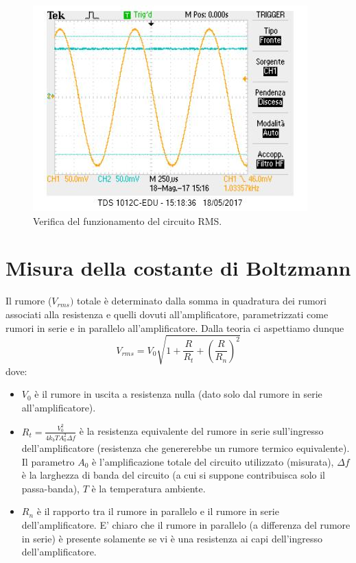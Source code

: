 \documentclass[10pt,a4paper]{article}
\begin{document}
\begin{figure}[!htb]
\centering
\includegraphics[scale=1.0]{vrms.jpg}
\caption{Verifica del funzionamento del circuito RMS.\label{rms}}
\end{figure}

\section{Misura della costante di Boltzmann}

Il rumore ($V_{rms})$ totale è determinato dalla somma in quadratura dei rumori associati alla resistenza e quelli dovuti all'amplificatore, parametrizzati come rumori in serie e in parallelo all'amplificatore. Dalla teoria ci aspettiamo dunque 
\begin{equation}
V_{rms} = V_0 \sqrt{1+\frac{R}{R_t}+(\frac{R}{R_n})^2}
\end{equation}
dove:
\begin{itemize}
\item $V_0$ è il rumore in uscita a resistenza nulla (dato solo dal rumore in serie all'amplificatore).
\item $R_t = \frac{V_0^2}{4 k_b T A_0^2 \Delta f}$ è la resistenza equivalente del rumore in serie sull'ingresso dell'amplificatore (resistenza che genererebbe un rumore termico equivalente). Il parametro $A_0$ è l'amplificazione totale del circuito utilizzato (misurata), $\Delta f$ è la larghezza di banda del circuito (a cui si suppone contribuisca solo il passa-banda), $T$ è la temperatura ambiente.\\
\item $R_n$ è il rapporto tra il rumore in parallelo e il rumore in serie dell'amplificatore. E' chiaro che il rumore in parallelo (a differenza del rumore in serie) è presente solamente se vi è una resistenza ai capi dell'ingresso dell'amplificatore.%
\end{itemize}
\end{document}
